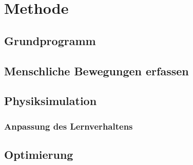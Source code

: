 \chapter{Methode}

\section{Grundprogramm}
\label{chap:m_grund}

\section{Menschliche Bewegungen erfassen}
\label{chap:m_mensch}

\section{Physiksimulation}
\label{chap:m_physik}

\subsection*{Anpassung des Lernverhaltens}
\label{chap:phy_m}

\section{Optimierung}
\label{chap:m_opti}



